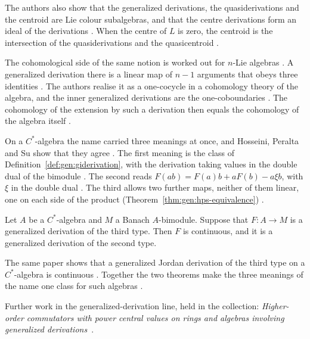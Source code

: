 The authors also show that the generalized derivations, the quasiderivations
and the centroid are Lie colour subalgebras, and that the centre derivations
form an ideal of the derivations \cite[Proposition~2.1, p.~926]{ChenMaNi2013}.
When the centre of $L$ is zero, the centroid is the intersection of the
quasiderivations and the quasicentroid \cite[Theorem~2.6,
p.~929]{ChenMaNi2013}.

The cohomological side of the same notion is worked out for $n$-Lie algebras
\cite[p.~1]{AtesliEsenSutlu2021}. A generalized derivation there is a linear
map of $n-1$ arguments that obeys three identities
\cite[p.~7]{AtesliEsenSutlu2021}. The authors realise it as a one-cocycle in a
cohomology theory of the algebra, and the inner generalized derivations are
the one-coboundaries \cite[p.~3]{AtesliEsenSutlu2021}. The cohomology of the
extension by such a derivation then equals the cohomology of the algebra
itself \cite[Corollary~3.2, p.~27]{AtesliEsenSutlu2021}.

On a $C^{*}$-algebra the name carried three meanings at once, and
Hosseini, Peralta and Su show that they agree
\cite[p.~1]{HosseiniPeraltaSu2025}. The first meaning is the class of
Definition~\ref{def:gen:giderivation}, with the derivation taking values in the
double dual of the bimodule \cite[p.~1]{HosseiniPeraltaSu2025}. The second reads
$F(ab)=F(a)b+aF(b)-a\xi b$, with $\xi$ in the double dual
\cite[p.~2]{HosseiniPeraltaSu2025}. The third allows two further maps, neither of
them linear, one on each side of the product (Theorem~\ref{thm:gen:hps-equivalence})
\cite[Definition~1.1, p.~3]{HosseiniPeraltaSu2025}.\begin{theorem}\label{thm:gen:hps-equivalence}
Let $A$ be a $C^{*}$-algebra and $M$ a Banach $A$-bimodule. Suppose that
$F\colon A\to M$ is a generalized derivation of the third type. Then $F$ is
continuous, and it is a generalized derivation of the second type.
\end{theorem}

The same paper shows that a generalized Jordan derivation of the third type on
a $C^{*}$-algebra is continuous \cite[Theorem~3.1,
p.~13]{HosseiniPeraltaSu2025}. Together the two theorems make the three
meanings of the name one class for such algebras
\cite[p.~1]{HosseiniPeraltaSu2025}.

Further work in the generalized-derivation line, held in the collection:
\noindent\emph{Higher-order commutators with power central values on rings and
algebras involving generalized
derivations}~\cite{LibHigherOrderCommutatorsWith2021}.

